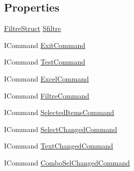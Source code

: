 \subsection*{Properties}
\begin{DoxyCompactItemize}
\item 
\hyperlink{struct_wpf_application_1_1_view_model_1_1_filtre_struct}{Filtre\-Struct} \hyperlink{class_wpf_application_1_1_view_model_1_1_main_window_view_model_a01234e72909d01f98d245a48709d96bf}{Sfiltre}
\item 
I\-Command \hyperlink{class_wpf_application_1_1_view_model_1_1_main_window_view_model_af9faf52029e4ef01aa4436d58548ca63}{Exit\-Command}
\item 
I\-Command \hyperlink{class_wpf_application_1_1_view_model_1_1_main_window_view_model_a7c28181152e62d237a59d2f778c7ef0c}{Test\-Command}
\item 
I\-Command \hyperlink{class_wpf_application_1_1_view_model_1_1_main_window_view_model_aea9aa9c929c10f71d89beb82d4fa26c1}{Excel\-Command}
\item 
I\-Command \hyperlink{class_wpf_application_1_1_view_model_1_1_main_window_view_model_ab12838cb1154ad278bded6b4366f356f}{Filtre\-Command}
\item 
I\-Command \hyperlink{class_wpf_application_1_1_view_model_1_1_main_window_view_model_a1b6ffad7c8cef7b0665ff73c8bdb01b7}{Selected\-Items\-Command}
\item 
I\-Command \hyperlink{class_wpf_application_1_1_view_model_1_1_main_window_view_model_a3dda2a9013e1d4cba7864004866bd0d2}{Select\-Changed\-Command}
\item 
I\-Command \hyperlink{class_wpf_application_1_1_view_model_1_1_main_window_view_model_a86bb2a58cef68a1dd3d1a9c8d403221b}{Text\-Changed\-Command}
\item 
I\-Command \hyperlink{class_wpf_application_1_1_view_model_1_1_main_window_view_model_a437a4aeaf5952c6d8ad2bfc7c1219fdb}{Combo\-Sel\-Changed\-Command}

\end{DoxyCompactItemize}
